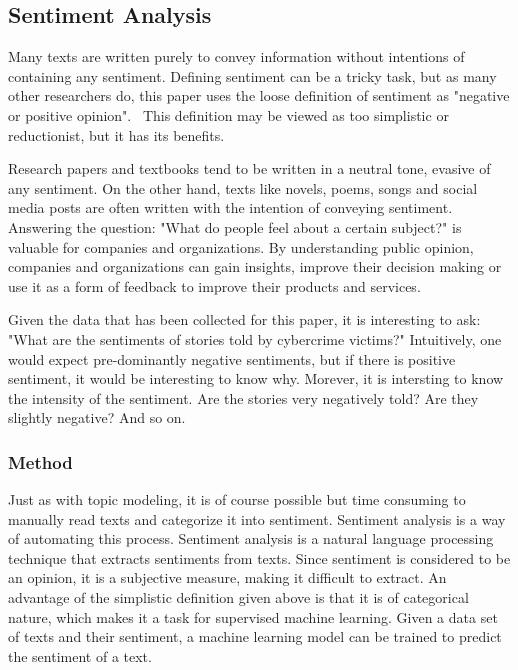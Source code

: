 \subsection{Sentiment Analysis}

Many texts are written purely to convey information without intentions of containing any sentiment. Defining sentiment can be a tricky task, but as many other researchers do, this paper uses the loose definition of sentiment as "negative or positive opinion".~\cite{mejova2009sentiment} This definition may be viewed as too simplistic or reductionist, but it has its benefits.

Research papers and textbooks tend to be written in a neutral tone, evasive of any sentiment. On the other hand, texts like novels, poems, songs and social media posts are often written with the intention of conveying sentiment. Answering the question: "What do people feel about a certain subject?" is valuable for companies and organizations. By understanding public opinion, companies and organizations can gain insights, improve their decision making or use it as a form of feedback to improve their products and services.~\cite{mejova2009sentiment}

Given the data that has been collected for this paper, it is interesting to ask: "What are the sentiments of stories told by cybercrime victims?" Intuitively, one would expect pre-dominantly negative sentiments, but if there is positive sentiment, it would be interesting to know why. Morever, it is intersting to know the intensity of the sentiment. Are the stories very negatively told? Are they slightly negative? And so on.

\subsubsection*{Method}

Just as with topic modeling, it is of course possible but time consuming to manually read texts and categorize it into sentiment. Sentiment analysis is a way of automating this process. Sentiment analysis is a natural language processing technique that extracts sentiments from texts. Since sentiment is considered to be an opinion, it is a subjective measure, making it difficult to extract. An advantage of the simplistic definition given above is that it is of categorical nature, which makes it a task for supervised machine learning. Given a data set of texts and their sentiment, a machine learning model can be trained to predict the sentiment of a text.

